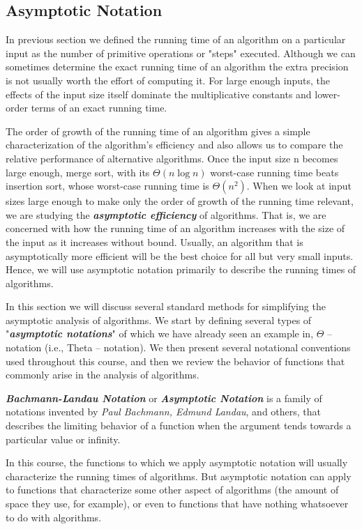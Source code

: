 \documentclass[12pt,a4paper]{book}
\begin{document}
\subsection{Asymptotic Notation}
In previous section we defined the running time of an algorithm on a particular input as the number of primitive operations or "steps" executed. Although we can sometimes determine the exact running time of an algorithm the extra precision is not usually worth the effort of computing it. For large enough inputs, the effects of the input size itself dominate the multiplicative constants and lower-order terms of an exact running time.
\par The order of growth of the running time of an algorithm gives a simple characterization of the algorithm's efficiency and also allows us to compare the relative performance of alternative algorithms. Once the input size n becomes large enough, merge sort, with its $\Theta (n\log n)$ worst-case running time beats insertion sort, whose worst-case running time is $\Theta (n^{2})$. When we look at input sizes large enough to make only the order of growth of the running time relevant, we are studying the \textbf{\textit{asymptotic efficiency}} of algorithms. That is, we are concerned with how the running time of an algorithm increases with the size of the input as it increases without bound. Usually, an algorithm that is asymptotically more efficient will be the best choice for all but very small inputs. Hence, we will use asymptotic notation primarily to describe the running times of algorithms.
\par In this section we will discuss several standard methods for simplifying the asymptotic analysis of algorithms. We start by defining several types of "\textbf{\textit{asymptotic notations}}" of which we have already seen an example in, $\Theta$ – notation (i.e., Theta – notation). We then present several notational conventions used throughout this course, and then we review the behavior of functions that commonly arise in the analysis of algorithms.
\par \textbf{\textit{Bachmann-Landau Notation}} or \textbf{\textit{Asymptotic Notation}} is a family of notations invented by \textit{Paul Bachmann, Edmund Landau}, and others, that describes the limiting behavior of a function when the argument tends towards a particular value or infinity.
\par In this course, the functions to which we apply asymptotic notation will usually characterize the running times of algorithms. But asymptotic notation can apply to functions that characterize some other aspect of algorithms (the amount of space they use, for example), or even to functions that have nothing whatsoever to do with algorithms.
\end{document}
